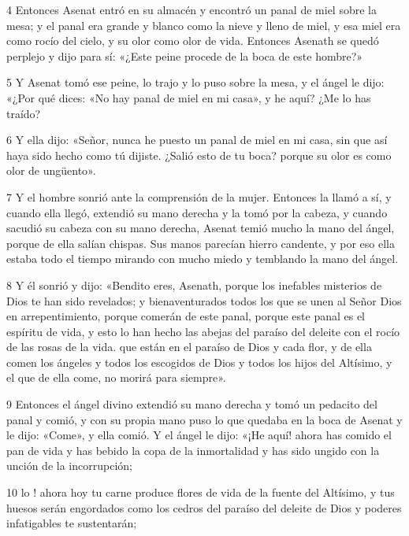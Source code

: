 \par 4 Entonces Asenat entró en su almacén y encontró un panal de miel sobre la mesa; y el panal era grande y blanco como la nieve y lleno de miel, y esa miel era como rocío del cielo, y su olor como olor de vida. Entonces Asenath se quedó perplejo y dijo para sí: «¿Este peine procede de la boca de este hombre?»

\par 5 Y Asenat tomó ese peine, lo trajo y lo puso sobre la mesa, y el ángel le dijo: «¿Por qué dices: «No hay panal de miel en mi casa», y he aquí? ¿Me lo has traído?

\par 6 Y ella dijo: «Señor, nunca he puesto un panal de miel en mi casa, sin que así haya sido hecho como tú dijiste. ¿Salió esto de tu boca? porque su olor es como olor de ungüento».

\par 7 Y el hombre sonrió ante la comprensión de la mujer. Entonces la llamó a sí, y cuando ella llegó, extendió su mano derecha y la tomó por la cabeza, y cuando sacudió su cabeza con su mano derecha, Asenat temió mucho la mano del ángel, porque de ella salían chispas. Sus manos parecían hierro candente, y por eso ella estaba todo el tiempo mirando con mucho miedo y temblando la mano del ángel.

\par 8 Y él sonrió y dijo: «Bendito eres, Asenath, porque los inefables misterios de Dios te han sido revelados; y bienaventurados todos los que se unen al Señor Dios en arrepentimiento, porque comerán de este panal, porque este panal es el espíritu de vida, y esto lo han hecho las abejas del paraíso del deleite con el rocío de las rosas de la vida. que están en el paraíso de Dios y cada flor, y de ella comen los ángeles y todos los escogidos de Dios y todos los hijos del Altísimo, y el que de ella come, no morirá para siempre».

\par 9 Entonces el ángel divino extendió su mano derecha y tomó un pedacito del panal y comió, y con su propia mano puso lo que quedaba en la boca de Asenat y le dijo: «Come», y ella comió. Y el ángel le dijo: «¡He aquí! ahora has comido el pan de vida y has bebido la copa de la inmortalidad y has sido ungido con la unción de la incorrupción;

\par 10 lo ! ahora hoy tu carne produce flores de vida de la fuente del Altísimo, y tus huesos serán engordados como los cedros del paraíso del deleite de Dios y poderes infatigables te sustentarán;

